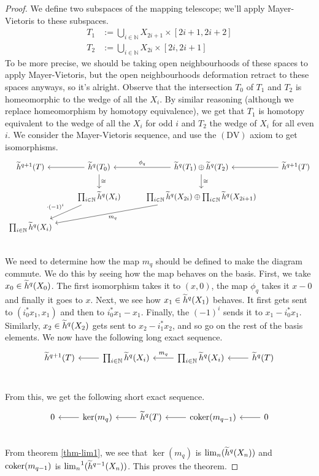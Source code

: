 \begin{proof}
  We define two subspaces of the mapping telescope; we'll apply Mayer-Vietoris to these subspaces.
  \begin{align*}
    T_1 &:= \bigcup_{i \in \mathbb{N}} X_{2i+1} \times [2i+1, 2i+2] \\
    T_2 &:= \bigcup_{i \in \mathbb{N}} X_{2i} \times [2i, 2i+1] 
  \end{align*}
  To be more precise, we should be taking open neighbourhoods of these spaces to apply
  Mayer-Vietoris, but the open neighbourhoods deformation retract to these spaces anyways, so it's
  alright.  Observe that the intersection $T_0$ of $T_1$ and $T_2$ is homeomorphic to the wedge of
  all the $X_i$.  By similar reasoning (although we replace homeomorphism by homotopy equivalence),
  we get that $T_1$ is homotopy equivalent to the wedge of all the $X_i$ for odd $i$ and $T_2$ the
  wedge of $X_i$ for all even $i$. We consider the Mayer-Vietoris sequence, and use the
  $(\mathrm{DV})$ axiom to get isomorphisms.
  \[
    \begin{tikzcd}
      \redco^{q+1}(T) & \redco^{q}(T_0) \ar[l] \ar[d, "\cong"] & \redco^{q}(T_1) \oplus \redco^{q}(T_2) \ar[l, swap, "\phi_q"] \ar[d, "\cong"] & \redco^{q+1}(T) \ar[l] \\
      & \prod_{i \in \mathbb{N}} \redco^{q}(X_i) \ar[dl, swap, "\cdot (-1)^i"] & \prod_{i \in \mathbb{N}} \redco^{q}(X_{2i}) \oplus \prod_{i \in \mathbb{N}} \redco^{q}(X_{2i+1}) \ar[dll, "m_q"] &   \\
      \prod_{i \in \mathbb{N}} \redco^{q}(X_i) & & & \\
    \end{tikzcd}
  \]
  We need to determine how the map $m_q$ should be defined to make the diagram commute.  We do this
  by seeing how the map behaves on the basis. First, we take $x_0 \in \widetilde{h}^{q}(X_0)$. The first
  isomorphism takes it to $(x, 0)$, the map $\phi_q$ takes it $x-0$ and finally it goes to
  $x$. Next, we see how $x_1 \in \widetilde{h}^{q}(X_1)$ behaves. It first gets sent to
  $(i_0^{\ast}x_1, x_1)$ and then to $i_0^{\ast}x_1 - x_1$.  Finally, the $(-1)^i$ sends it to
  $x_1 - i_0^{\ast}x_1$. Similarly, $x_2 \in \widetilde{h}^{q}(X_2)$ gets sent to $x_2-i_1^{\ast}x_2$, and
  so go on the rest of the basis elements. We now have the following long exact sequence.
  \[
    \begin{tikzcd}
      \redco^{q+1}(T) & \prod_{i \in \mathbb{N}}\redco^{q} (X_i) \ar[l] & \prod_{i \in \mathbb{N}}\redco^{q} (X_i) \ar[swap, l, "m_q"] & \redco^{q}(T) \ar[l] \\
    \end{tikzcd}
  \]

  From this, we get the following short exact sequence.
  \[
    \begin{tikzcd}
      0 & \ker(m_q) \ar[l] & \redco^{q}(T) \ar[l] & \coker(m_{q-1}) \ar[l] & 0 \ar[l] \\
    \end{tikzcd}
  \]
  From theorem \ref{thm-lim1}, we see that $\ker(m_q)$ is $\lim_n(\widetilde{h}^{q}(X_n))$ and
  $\mathrm{coker}(m_{q-1})$ is ${\lim_n}^1(\widetilde{h}^{q-1}(X_n))$. This proves the theorem.

\end{proof}





